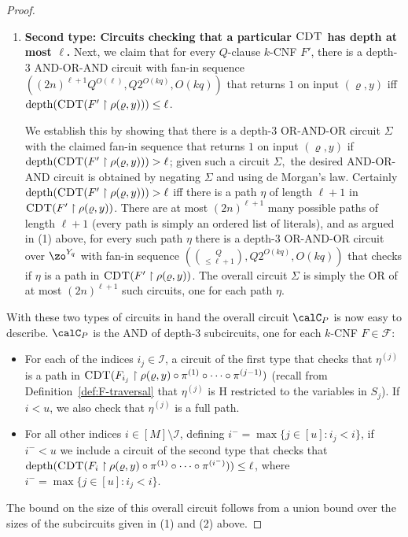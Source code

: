 \documentclass[11pt]{article}
\numberwithin{equation}{section}
\theoremstyle{definition}
\theoremstyle{plain}
\theoremstyle{plain}
\newcommand{\uhr}{\upharpoonright}
\newcommand{\CDT}{\textsc{CDT}}
\newcommand{\depth}{\mathrm{depth}}
\begin{document}
\begin{proof}
\begin{enumerate}
\item {\bf Second type: Circuits checking that a particular $\CDT$ has depth at most $\ell$.} Next, we claim that for every $Q$-clause $k$-CNF $F'$, there is a depth-3 AND-OR-AND circuit with fan-in sequence $((2n)^{\ell+1}Q^{O(\ell)}, Q2^{O(kq)}, O(kq))$ that returns $1$ on input $(\varrho,y)$ iff $\depth(\CDT(F' \uhr \rho(\varrho,y))) \le \ell$. 

We establish this by showing that there is a depth-$3$ OR-AND-OR circuit $\Sigma$ with the claimed fan-in sequence that returns $1$ on input $(\varrho,y)$ if $\depth(\CDT(F' \uhr\rho(\varrho,y))) > \ell$; given such a circuit $\Sigma,$ the desired AND-OR-AND circuit is obtained by negating $\Sigma$ and using de Morgan's law. Certainly $\depth(\CDT(F'\uhr \rho(\varrho,y))) > \ell$ iff there is a path $\eta$ of length $\ell+1$ in $\CDT(F' \uhr\rho(\varrho,y))$.  There are at most $(2n)^{\ell+1}$ many possible paths of length $\ell+1$ (every path is simply an ordered list of literals), and as argued in (1) above, for every such path $\eta$ there is a depth-$3$ OR-AND-OR circuit over $\zo^{Y_q}$ with fan-in sequence $({Q\choose \le \ell+1}, Q2^{O(kq)},O(kq))$  that checks if $\eta$ is a path in $\CDT(F'\uhr \rho(\varrho,y))$.  The overall circuit $\Sigma$ is simply the OR of at most $(2n)^{\ell+1}$ such circuits, one for each path $\eta$. 
\end{enumerate} 



With these two types of circuits in hand the overall circuit $\calC_P$ is now easy to describe. $\calC_P$ is the AND of
%
depth-$3$ subcircuits, one for each $k$-CNF $F \in \mathscr{F}$: 
\begin{itemize}
\item For each of the
%
indices $i_j \in \mathscr{I}$, a circuit of the first type that checks that $\eta^{(j)}$ is a path in $\CDT(F_{i_j} \uhr \rho(\varrho,y) \circ \pi^{(1)} \circ \cdots \circ \pi^{(j-1)})$ (recall from Definition~\ref{def:F-traversal} that $\eta^{(j)}$ is ${\mathrm{H}}$ restricted to the variables in $S_j$).  If $i < u$, we also check that $\eta^{(j)}$ is a full path. 
\item For all
%
other indices $i \in [M] \setminus \mathscr{I}$, defining $i^{-} = \max \{ j \in [u] \colon i_j < i\}$, if $i^{-} < u$ we include a circuit of the second type that checks that $\depth(\CDT(F_i \uhr \rho(\varrho,y) \circ \pi^{(1)}\circ \cdots\circ\pi^{(i^{-})})) \le \ell$, where $i^{-} = \max \{ j \in [u] \colon i_j < i\}$.    
\end{itemize} 
The bound on the size of this overall circuit follows from a union bound over the sizes of the subcircuits given in (1) and (2) above. 
\end{proof} 
\end{document}
